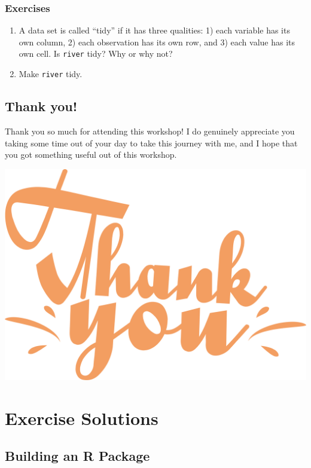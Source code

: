 \documentclass[
]{book}
\begin{document}
\hypertarget{ex-set14}{%
\subsection{Exercises}\label{ex-set14}}

\begin{enumerate}
\def\labelenumi{\arabic{enumi}.}
\item
  A data set is called ``tidy'' if it has three qualities: 1) each variable has its own column, 2) each observation has its own row, and 3) each value has its own cell. Is \texttt{river} tidy? Why or why not?
\item
  Make \texttt{river} tidy.
\end{enumerate}

\hypertarget{thank-you}{%
\section{Thank you!}\label{thank-you}}

Thank you so much for attending this workshop! I do genuinely appreciate you taking some time out of your day to take this journey with me, and I hope that you got something useful out of this workshop.

\begin{center}\includegraphics[width=0.5\linewidth]{images/thank_you} \end{center}

\hypertarget{exercise-solutions}{%
\chapter{Exercise Solutions}\label{exercise-solutions}}

\hypertarget{building-an-r-package}{%
\section*{Building an R Package}\label{building-an-r-package}}
\end{document}
